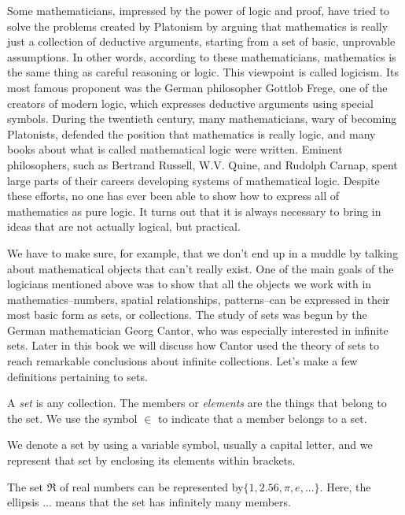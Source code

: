     Some mathematicians, impressed by the power of logic and proof, have tried to solve the problems created by Platonism by arguing that mathematics is really just a collection of deductive arguments, starting from a set of basic, unprovable assumptions.  In other words, according to these mathematicians, mathematics is the same thing as careful reasoning or logic.  This viewpoint is called logicism.  Its most famous proponent  was the German philosopher Gottlob Frege, one of the creators of modern logic, which expresses deductive arguments using special symbols.  During the twentieth century, many mathematicians, wary of becoming Platonists, defended the position that mathematics is really logic, and many books about what is called mathematical logic were written.  Eminent philosophers, such as Bertrand Russell, W.V. Quine, and Rudolph Carnap, spent large parts of their careers developing systems of mathematical logic.  Despite these efforts, no one has ever been able to show how to express all of mathematics as pure logic.   It turns out that it is always necessary to bring in ideas that are not actually logical, but practical.
     
     We have to make sure, for example, that we don't end up in a muddle by talking about mathematical objects that can't really exist.  One of the main goals of the logicians mentioned above was to show that all the objects we work with in mathematics--numbers, spatial relationships, patterns--can be expressed in their most basic form as sets, or collections.  The study of sets was begun by the German mathematician Georg Cantor, who was especially interested in infinite sets.  Later in this book we will discuss how Cantor used the theory of sets to reach remarkable conclusions about infinite collections.  Let's make a few definitions pertaining to sets.
     
\begin{dfn}
A \emph{set} is any collection.  The members or \emph{elements} are the things that belong to the set.  We use the symbol $\in$ to indicate that a member belongs to a set.
\end{dfn}

We denote a set by using a variable symbol, usually a capital letter, and we represent that set by enclosing its elements within brackets.

\begin{exm}{1}
The set $\Re$ of real numbers can be represented by$\lbrace 1, 2.56, \pi, e, ...\rbrace$.  Here, the ellipsis ... means that the set has infinitely many members.
\end{exm}

